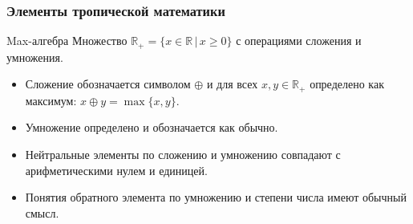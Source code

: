 \documentclass[ucs, notheorems, handout]{beamer}
\begin{document}


\begin{frame}
    \frametitle{Элементы тропической математики}
    \begin{block}{Max-алгебра}
        Множество $\mathbb{R}_+ = \{x \in \mathbb{R} \, |\, x \geq 0\}$ с операциями сложения и умножения.
    \end{block}
    \begin{itemize}
        \item Сложение обозначается символом $\oplus$ и для всех $x,y\in\mathbb{R}_{+}$ определено как максимум: $x\oplus y=\max\{x,y\}$.
        \item Умножение определено и обозначается как обычно.
        \item Нейтральные элементы по сложению и умножению совпадают с арифметическими нулем и единицей.
        \item Понятия обратного элемента по умножению и степени числа имеют обычный смысл. 
    \end{itemize}
\end{frame}
\end{document}
